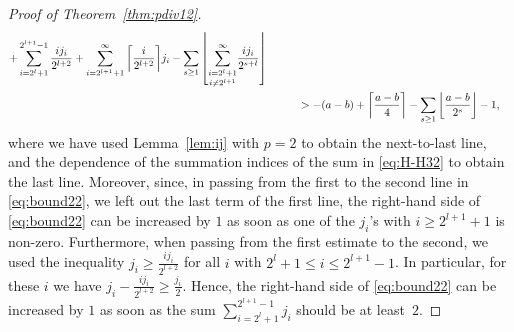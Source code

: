 \documentclass[12pt,reqno]{amsart}
\numberwithin{equation}{section}
\theoremstyle{remark}
\begin{document}
\begin{proof}[Proof of Theorem~{\em \ref{thm:pdiv12}}]
{\begin{align}
+\sum_{i=2^{l}+1}^{2^{l+1}-1} \frac {ij_{i}} {2^{l+2}}
+\sum_{i=2^{l+1}+1}^{\infty} 
{\left\lceil{\frac {i} {2^{l+2}}}\right\rceil}j_{i}
-\sum_{s\ge1}{\left\lfloor{{\underset{i\ne 2^{l+1}}
{\sum_{i=2^l+1}^\infty} \frac {ij_i} {2^{s+l}}}}\right\rfloor}\\
&\kern1cm
>
-(a-b)
+{\left\lceil{\frac {a-b} {4}}\right\rceil}
-\sum_{s\ge1}{\left\lfloor{\frac {a-b} {2^{s}}}\right\rfloor}
-1,
\label{eq:bound22}
\end{align}}where we have used Lemma~\ref{lem:ij} with $p=2$ to obtain the 
next-to-last line,
and the dependence of the summation indices of the sum
in \eqref{eq:H-H32} to obtain the last line.
Moreover, since, in passing from the first to the second line in
\eqref{eq:bound22}, we left out the last term of the first line,
the right-hand side of \eqref{eq:bound22} can be increased by $1$
as soon as one of the $j_i$'s with 
$i\ge 2^{l+1}+1$ is non-zero. Furthermore, when passing
from the first estimate to the second, we used the inequality
$j_i\ge\frac {ij_i} {2^{l+2}}$ for all $i$ with $2^{l}+1\le i\le
2^{l+1}-1$. In particular, for these $i$ we have
$j_i-\frac {ij_i} {2^{l+2}}\ge \frac {j_i} {2}$. Hence, 
the right-hand side of \eqref{eq:bound22} can be increased by $1$
as soon as the sum $\sum_{i=2^l+1}^{2^{l+1}-1}j_i$
should be at least~$2$.


\end{proof}
\end{document}
